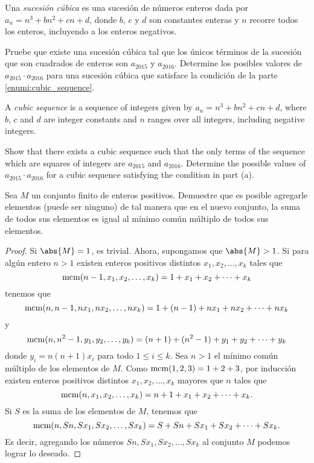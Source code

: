 \begin{problem}[RMM 2016/3]
	Una \emph{sucesión cúbica} es una sucesión de números enteros dada por $a_n=n^3+bn^2+cn+d$, donde $b$, $c$ y $d$ son constantes enteras y $n$ recorre todos los enteros, incluyendo a los enteros negativos.
	\begin{enumerate}[(a)]
		\ii \label{enumi:cubic_sequence} Pruebe que existe una sucesión cúbica tal que los únicos términos de la sucesión que son cuadrados de enteros son $a_{2015}$ y $a_{2016}$.
		\ii Determine los posibles valores de $a_{2015}\cdot a_{2016}$ para una sucesión cúbica que satisface la condición de la parte \ref{enumi:cubic_sequence}.
	\end{enumerate}
	\begin{hint}
		A \emph{cubic sequence} is a sequence of integers given by $a_n=n^3+bn^2+cn+d$, where $b$, $c$ and $d$ are integer constants and $n$ ranges over all integers, including negative integers.
		\begin{enumerate}[(a)]
			\ii Show that there exists a cubic sequence such that the only terms of the sequence which are squares of integers are $a_{2015}$ and $a_{2016}$.
			\ii Determine the possible values of $a_{2015}\cdot a_{2016}$ for a cubic sequence satisfying the condition in part (a).
		\end{enumerate}
	\end{hint}
\end{problem}


\begin{probMG}
	Sea $M$ un conjunto finito de enteros positivos. Demuestre que es posible agregarle elementos (puede ser ninguno) de tal manera que en el nuevo conjunto, la suma de todos sus elementos es igual al mínimo común múltiplo de todos sus elementos.
\end{probMG}

\begin{proof}
	Si $\abs{M}=1$, es trivial. Ahora, supongamos que $\abs{M}>1$. Si para algún entero $n>1$ existen enteros positivos distintos $x_1,x_2,\dots,x_k$ tales que
	\[\operatorname{mcm}(n-1,x_1,x_2,\dots,x_k)=1+x_1+x_2+\dots+x_k\]
	tenemos que
	\[\operatorname{mcm}(n,n-1,nx_1,nx_2,\dots,nx_k)=1+(n-1)+nx_1+nx_2+\dots+nx_k\]
	y
	\[\operatorname{mcm}(n,n^2-1,y_1,y_2,\dots,y_k)=(n+1)+(n^2-1)+y_1+y_2+\dots+y_k\]
	donde $y_i=n(n+1)x_i$ para todo $1\le i\le k$. Sea $n>1$ el mínimo común múltiplo de los elementos de $M$. Como $\operatorname{mcm}(1,2,3)=1+2+3$, por inducción existen enteros positivos distintos $x_1,x_2,\dots,x_k$ mayores que $n$ tales que
	\[\operatorname{mcm}(n,x_1,x_2,\dots,x_k)=n+1+x_1+x_2+\dots+x_k.\]
	Si $S$ es la suma de los elementos de $M$, tenemos que
	\[\operatorname{mcm}(n,Sn,Sx_1,Sx_2,\dots,Sx_k)=S+Sn+Sx_1+Sx_2+\dots+Sx_k.\]
	Es decir, agregando los números $Sn,Sx_1,Sx_2,\dots,Sx_k$ al conjunto $M$ podemos lograr lo deseado.
\end{proof}
